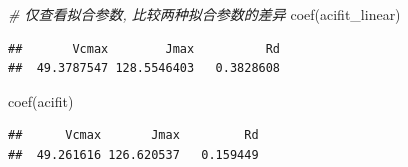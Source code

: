 \documentclass[
]{krantz}
\makeatletter
\newenvironment{Shaded}{\begin{snugshade}}{\end{snugshade}}
\newcommand{\CommentTok}[1]{\textcolor[rgb]{0.56,0.35,0.01}{\textit{#1}}}
\newcommand{\FunctionTok}[1]{\textcolor[rgb]{0.00,0.00,0.00}{#1}}
\newcommand{\NormalTok}[1]{#1}
\newenvironment{kframe}{%
\medskip{}
\setlength{\fboxsep}{.8em}
 \def\at@end@of@kframe{}%
 \ifinner\ifhmode%
  \def\at@end@of@kframe{\end{minipage}}%
  \begin{minipage}{\columnwidth}%
 \fi\fi%
 \def\FrameCommand##1{\hskip\@totalleftmargin \hskip-\fboxsep
 \colorbox{shadecolor}{##1}\hskip-\fboxsep
     \hskip-\linewidth \hskip-\@totalleftmargin \hskip\columnwidth}%
 \MakeFramed {\advance\hsize-\width
   \@totalleftmargin\z@ \linewidth\hsize
   \@setminipage}}%
 {\par\unskip\endMakeFramed%
 \at@end@of@kframe}
\renewenvironment{Shaded}{\begin{kframe}}{\end{kframe}}
\makeatother
\begin{document}
\begin{Shaded}
\begin{Highlighting}[]
\CommentTok{\# 仅查看拟合参数, 比较两种拟合参数的差异}
\FunctionTok{coef}\NormalTok{(acifit\_linear)}
\end{Highlighting}
\end{Shaded}

\begin{verbatim}
##       Vcmax        Jmax          Rd 
##  49.3787547 128.5546403   0.3828608
\end{verbatim}

\begin{Shaded}
\begin{Highlighting}[]
\FunctionTok{coef}\NormalTok{(acifit)}
\end{Highlighting}
\end{Shaded}

\begin{verbatim}
##      Vcmax       Jmax         Rd 
##  49.261616 126.620537   0.159449
\end{verbatim}
\end{document}
